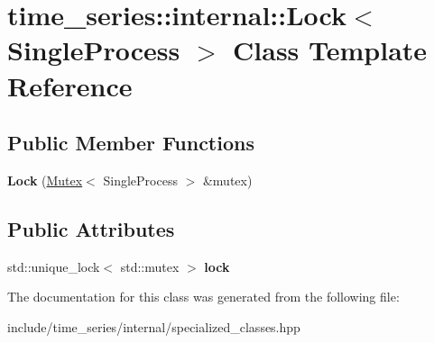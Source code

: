 \hypertarget{classtime__series_1_1internal_1_1Lock_3_01SingleProcess_01_4}{}\section{time\+\_\+series\+:\+:internal\+:\+:Lock$<$ Single\+Process $>$ Class Template Reference}
\label{classtime__series_1_1internal_1_1Lock_3_01SingleProcess_01_4}
\subsection*{Public Member Functions}
\begin{DoxyCompactItemize}
\item 
{\bfseries Lock} (\hyperlink{classtime__series_1_1internal_1_1Mutex}{Mutex}$<$ Single\+Process $>$ \&mutex)\hypertarget{classtime__series_1_1internal_1_1Lock_3_01SingleProcess_01_4_a72f9c7a4ed7e234e29944a88998dd33c}{}\label{classtime__series_1_1internal_1_1Lock_3_01SingleProcess_01_4_a72f9c7a4ed7e234e29944a88998dd33c}

\end{DoxyCompactItemize}
\subsection*{Public Attributes}
\begin{DoxyCompactItemize}
\item 
std\+::unique\+\_\+lock$<$ std\+::mutex $>$ {\bfseries lock}\hypertarget{classtime__series_1_1internal_1_1Lock_3_01SingleProcess_01_4_a68c4eb7f7a836b37f4296e09b498edbe}{}\label{classtime__series_1_1internal_1_1Lock_3_01SingleProcess_01_4_a68c4eb7f7a836b37f4296e09b498edbe}

\end{DoxyCompactItemize}


The documentation for this class was generated from the following file\+:\begin{DoxyCompactItemize}
\item 
include/time\+\_\+series/internal/specialized\+\_\+classes.\+hpp\end{DoxyCompactItemize}
